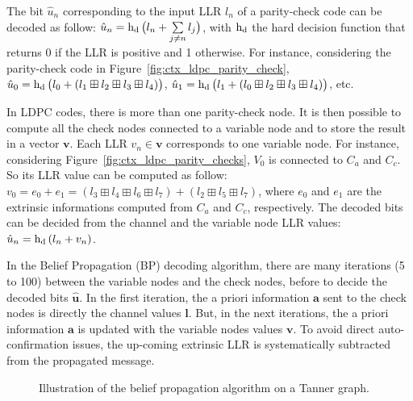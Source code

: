 The bit $\hat{u}_n$ corresponding to the input LLR $l_n$ of a parity-check code
can be decoded as follow: $\hat{u}_n = \operatorname{h_d}\big(l_n +
\sum\limits_{j \neq n}{l_j}\big)$, with $\operatorname{h_d}$ the hard decision function
that returns 0 if the LLR is positive and 1 otherwise. For instance, considering
the parity-check code in Figure~\ref{fig:ctx_ldpc_parity_check}, $\hat{u}_0 =
\operatorname{h_d}\big(l_0 + (l_1 \boxplus l_2 \boxplus l_3 \boxplus l_4)\big)$,
$\hat{u}_1 = \operatorname{h_d}\big(l_1 + (l_0 \boxplus l_2 \boxplus l_3 \boxplus
l_4)\big)$, etc.

In LDPC codes, there is more than one parity-check node. It is then possible to
compute all the check nodes connected to a variable node and to store the result
in a vector $\bm{v}$. Each LLR $v_n \in \bm{v}$ corresponds to one variable
node. For instance, considering Figure~\ref{fig:ctx_ldpc_parity_checks}, $V_0$
is connected to $C_a$ and $C_c$. So its LLR value can be computed as follow:
$v_0 = e_0 + e_1 = (l_3 \boxplus l_4 \boxplus l_6 \boxplus l_7) + (l_2 \boxplus
l_5 \boxplus l_7)$, where $e_0$ and $e_1$ are the extrinsic informations
computed from $C_a$ and $C_c$, respectively. The decoded bits can be decided
from the channel and the variable node LLR values: $\hat{u}_n = \operatorname{h_d}{(l_n +
v_n)}$.

In the Belief Propagation (BP) decoding algorithm, there are many iterations (5
to 100) between the variable nodes and the check nodes, before to decide the
decoded bits $\bm{\hat{u}}$. In the first iteration, the a priori information
$\bm{a}$ sent to the check nodes is directly the channel values $\bm{l}$. But,
in the next iterations, the a priori information $\bm{a}$ is updated with the
variable nodes values $\bm{v}$. To avoid direct auto-confirmation issues, the
up-coming extrinsic LLR is systematically subtracted from the propagated
message.

\begin{figure}[htp]
  \centering
  \quad
  \caption{Illustration of the belief propagation algorithm on a Tanner graph.}
  \label{fig:ctx_ldpc_bp}
\end{figure}

